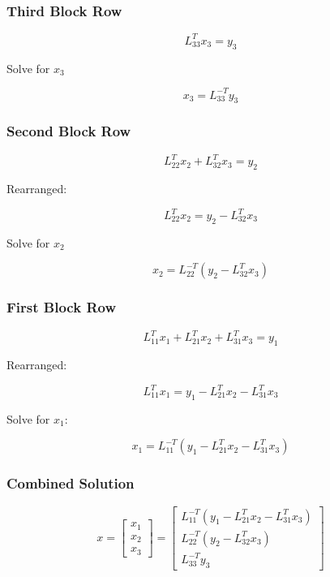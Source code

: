 \documentclass[
  letterpaper,
  DIV=11,
  numbers=noendperiod]{scrartcl}
\begin{document}
\subsubsection{\texorpdfstring{\textbf{Third Block
Row}}{Third Block Row}}\label{third-block-row-1}

\[
L_{33}^Tx_3 = y_3
\]

Solve for \(x_3\)

\[
x_3 = L_{33}^{-T}y_3
\]

\subsubsection{\texorpdfstring{\textbf{Second Block
Row}}{Second Block Row}}\label{second-block-row-1}

\[
L_{22}^Tx_2 + L_{32}^Tx_3 = y_2
\]

Rearranged:

\[
L_{22}^Tx_2 = y_2 - L_{32}^Tx_3
\]

Solve for \(x_2\)

\[
x_2 = L_{22}^{-T}\left(y_2 - L_{32}^Tx_3\right)
\]

\subsubsection{\texorpdfstring{\textbf{First Block
Row}}{First Block Row}}\label{first-block-row-1}

\[
L_{11}^Tx_1 + L_{21}^Tx_2 + L_{31}^Tx_3 = y_1
\]

Rearranged:

\[
L_{11}^Tx_1 = y_1 - L_{21}^Tx_2 - L_{31}^Tx_3
\]

Solve for \(x_1\):

\[
x_1 = L_{11}^{-T}\left(y_1 - L_{21}^Tx_2 - L_{31}^Tx_3\right)
\]

\subsubsection{\texorpdfstring{\textbf{Combined
Solution}}{Combined Solution}}\label{combined-solution-1}

\[
x = \begin{bmatrix}
x_1 \\
x_2 \\
x_3
\end{bmatrix} =
\begin{bmatrix}
L_{11}^{-T}\left(y_1 - L_{21}^Tx_2 - L_{31}^Tx_3\right) \\
L_{22}^{-T}\left(y_2 - L_{32}^Tx_3\right) \\
L_{33}^{-T}y_3
\end{bmatrix}
\]
\end{document}
